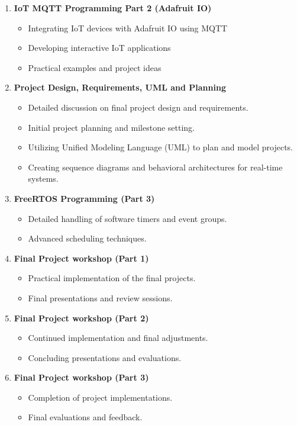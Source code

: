 \begin{enumerate}[label=\textbf{Week \arabic*:}]
    \item \textbf{IoT MQTT Programming Part 2 (Adafruit IO)}
    \begin{itemize}
        \item Integrating IoT devices with Adafruit IO using MQTT
        \item Developing interactive IoT applications
        \item Practical examples and project ideas
    \end{itemize}

    \item \textbf{Project Design, Requirements, UML and Planning}
    \begin{itemize}
        \item Detailed discussion on final project design and requirements.
        \item Initial project planning and milestone setting.
        \item Utilizing Unified Modeling Language (UML) to plan and model projects.
        \item Creating sequence diagrams and behavioral architectures for real-time systems.
    \end{itemize}

    \item \textbf{FreeRTOS Programming (Part 3)}
    \begin{itemize}
        \item Detailed handling of software timers and event groups.
        \item Advanced scheduling techniques.
    \end{itemize}

    \item \textbf{Final Project workshop (Part 1)}
    \begin{itemize}
        \item Practical implementation of the final projects.
        \item Final presentations and review sessions.
    \end{itemize}

    \item \textbf{Final Project workshop (Part 2)}
    \begin{itemize}
        \item Continued implementation and final adjustments.
        \item Concluding presentations and evaluations.
    \end{itemize}

    \item \textbf{Final Project workshop (Part 3)}
    \begin{itemize}
        \item Completion of project implementations.
        \item Final evaluations and feedback.
    \end{itemize}

\end{enumerate}